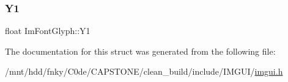 \mbox{\label{structImFontGlyph_aa6a0440694ae06c4cf03316498327bd2}} 
\subsubsection{\texorpdfstring{Y1}{Y1}}
{\footnotesize\ttfamily float Im\+Font\+Glyph\+::\+Y1}



The documentation for this struct was generated from the following file\+:\begin{DoxyCompactItemize}
\item 
/mnt/hdd/fnky/\+C0de/\+C\+A\+P\+S\+T\+O\+N\+E/clean\+\_\+build/include/\+I\+M\+G\+U\+I/\hyperlink{imgui_8h}{imgui.\+h}\end{DoxyCompactItemize}
